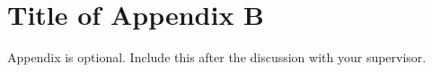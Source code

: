 \chapter{Title of Appendix B}
\label{appendixB}
Appendix is optional. Include this after the discussion with your supervisor. 